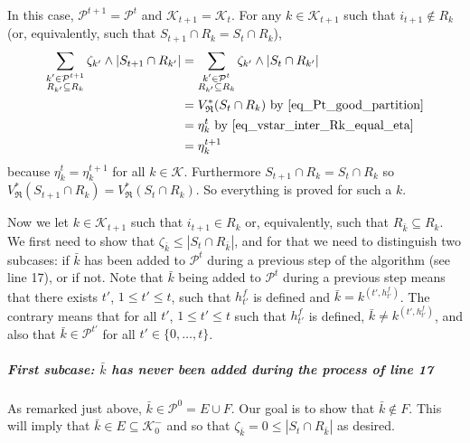 \documentclass[
  11pt,
  a4paper,
]{article}
\let\oldsubparagraph\subparagraph
\renewcommand{\subparagraph}[1]{\oldsubparagraph{#1}\mbox{}}
\theoremstyle{definition}
\theoremstyle{plain}
\theoremstyle{plain}
\theoremstyle{plain}
\theoremstyle{definition}
\theoremstyle{remark}
\begin{document}
In this case, \(\mathcal{P}^{t+1}=\mathcal{P}^t\) and
\(\mathcal{K}_{t+1}=\mathcal{K}_t\). For any \(k\in\mathcal{K}_{t+1}\)
such that \(i_{t+1}\not\in R_k\) (or, equivalently, such that
\(S_{t+1}\cap R_k=S_t\cap R_k\)), \begin{align*}
\sum_{\substack{k'\in\mathcal{P}^{t+1} \\ R_{k'}\subseteq R_k}} \zeta_{k'}\wedge |S_{t+1}\cap R_{k'}|&=\sum_{\substack{k'\in\mathcal{P}^{t} \\ R_{k'}\subseteq R_k}} \zeta_{k'}\wedge |S_{t}\cap R_{k'}| \\
&=V^*_{\mathfrak{R}}(S_t\cap R_k) \text{ by~\eqref{eq_Pt_good_partition}}\\
&=\eta_k^t \text{ by~\eqref{eq_vstar_inter_Rk_equal_eta}}\\
&=\eta_k^{t+1}
\end{align*} because \(\eta_k^t=\eta_k^{t+1}\) for all
\(k\in\mathcal{K}\). Furthermore \(S_{t+1}\cap R_k=S_t\cap R_k\) so
\(V^*_{\mathfrak{R}}(S_{t+1}\cap R_k)=V^*_{\mathfrak{R}}(S_t\cap R_k)\).
So everything is proved for such a \(k\).

Now we let \(k\in\mathcal{K}_{t+1}\) such that \(i_{t+1}\in R_k\) or,
equivalently, such that \(R_{\bar k}\subseteq R_k\). We first need to
show that \(\zeta_{\bar k}\leq |S_t\cap R_{\bar k}|\), and for that we
need to distinguish two subcases: if \(\bar k\) has been added to
\(\mathcal{P}^t\) during a previous step of the algorithm (see line 17),
or if not. Note that \(\bar k\) being added to \(\mathcal{P}^t\) during
a previous step means that there exists \(t'\), \(1\leq t'\leq t\), such
that \(h^f_{t'}\) is defined and \(\bar k= k^{(t',h^f_{t'})}\). The
contrary means that for all \(t'\), \(1\leq t'\leq t\) such that
\(h^f_{t'}\) is defined, \(\bar k\neq k^{(t',h^f_{t'})}\), and also that
\(\bar k\in\mathcal{P}^{t'}\) for all \(t'\in\{0,\dotsc,t\}\).

\subparagraph{\texorpdfstring{First subcase: \(\bar k\) has never been
added during the process of line
17}{First subcase: \textbackslash bar k has never been added during the process of line 17}}\label{first-subcase-bar-k-has-never-been-added-during-the-process-of-line-17}

As remarked just above, \(\bar k\in\mathcal{P}^{0}=E\cup F\). Our goal
is to show that \(\bar k\not\in F\). This will imply that
\(\bar k\in E\subseteq \mathcal{K}_0^-\) and so that
\(\zeta_{\bar k}=0\leq| S_{t}\cap R_{\bar k} |\) as desired.
\end{document}
